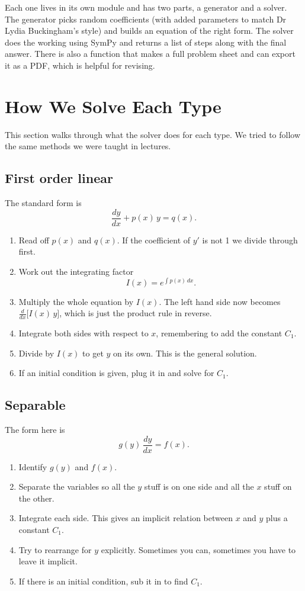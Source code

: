 \documentclass{article}
\begin{document}
Each one lives in its own module and has two parts, a generator and a solver. The generator picks random coefficients (with added parameters to match Dr Lydia Buckingham's style) and builds an equation of the right form. The solver does the working using SymPy and returns a list of steps along with the final answer. There is also a function that makes a full problem sheet and can export it as a PDF, which is helpful for revising.

\section{How We Solve Each Type}

This section walks through what the solver does for each type. We tried to follow the same methods we were taught in lectures.

\subsection{First order linear}
The standard form is
\[
\frac{dy}{dx} + p(x)\, y = q(x).
\]
\begin{enumerate}
    \item Read off $p(x)$ and $q(x)$. If the coefficient of $y'$ is not 1 we divide through first.
    \item Work out the integrating factor
    \[
        I(x) = e^{\int p(x)\,dx}.
    \]
    \item Multiply the whole equation by $I(x)$. The left hand side now becomes $\frac{d}{dx}\big[I(x)\,y\big]$, which is just the product rule in reverse.
    \item Integrate both sides with respect to $x$, remembering to add the constant $C_1$.
    \item Divide by $I(x)$ to get $y$ on its own. This is the general solution.
    \item If an initial condition is given, plug it in and solve for $C_1$.
\end{enumerate}

\subsection{Separable}
The form here is
\[
g(y)\,\frac{dy}{dx} = f(x).
\]
\begin{enumerate}
    \item Identify $g(y)$ and $f(x)$.
    \item Separate the variables so all the $y$ stuff is on one side and all the $x$ stuff on the other.
    \item Integrate each side. This gives an implicit relation between $x$ and $y$ plus a constant $C_1$.
    \item Try to rearrange for $y$ explicitly. Sometimes you can, sometimes you have to leave it implicit.
    \item If there is an initial condition, sub it in to find $C_1$.
\end{enumerate}
\end{document}
